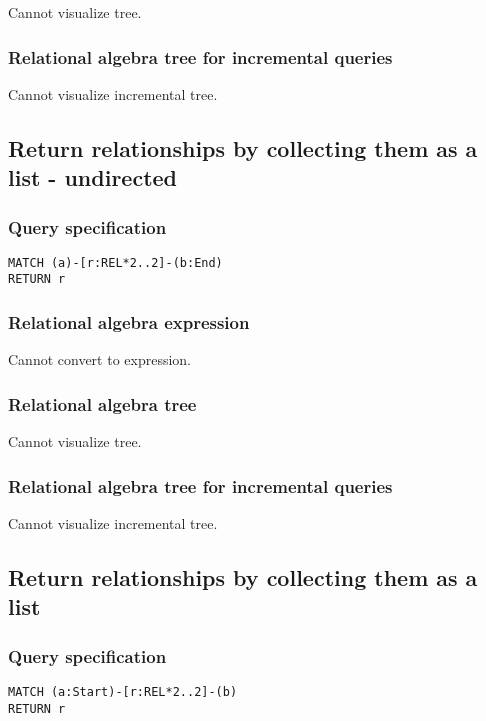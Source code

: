 Cannot visualize tree.

\subsubsection*{Relational algebra tree for incremental queries}

Cannot visualize incremental tree.

\subsection{Return relationships by collecting them as a list - undirected}

\subsubsection*{Query specification}

\begin{lstlisting}
MATCH (a)-[r:REL*2..2]-(b:End)
RETURN r
\end{lstlisting}

\subsubsection*{Relational algebra expression}

Cannot convert to expression.

\subsubsection*{Relational algebra tree}

Cannot visualize tree.

\subsubsection*{Relational algebra tree for incremental queries}

Cannot visualize incremental tree.

\subsection{Return relationships by collecting them as a list}

\subsubsection*{Query specification}

\begin{lstlisting}
MATCH (a:Start)-[r:REL*2..2]-(b)
RETURN r
\end{lstlisting}

